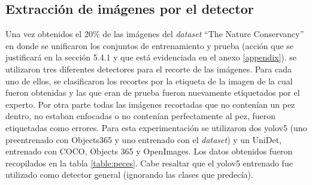 \subsection{Extracción de imágenes por el detector} 
Una vez obtenidos el 20\% de las imágenes del \textit{dataset} ``The Nature Conservancy'' en donde se unificaron los conjuntos de entrenamiento y prueba (acción que se justificará en la sección 5.4.1 y que está evidenciada en el anexo \ref{appendix}). se utilizaron tres diferentes detectores para el recorte de las imágenes. Para cada uno de ellos, se clasificaron los recortes por la etiqueta de la imagen de la cual fueron obtenidas y las que eran de prueba fueron nuevamente etiquetados por el experto. Por otra parte todas las imágenes recortadas que no contenían un pez dentro, no estaban enfocadas o no contenían perfectamente al pez, fueron etiquetadas como errores. Para esta experimentación se utilizaron dos yolov5 (uno preentrenado con Objects365 y uno entrenado con el \textit{dataset}) y un UniDet, entrenado con COCO, Objects 365 y OpenImages. Los datos obtenidos fueron recopilados en la tabla \ref{table:peces}. Cabe resaltar que el yolov5 entrenado fue utilizado como detector general (ignorando las clases que predecía).
\\
